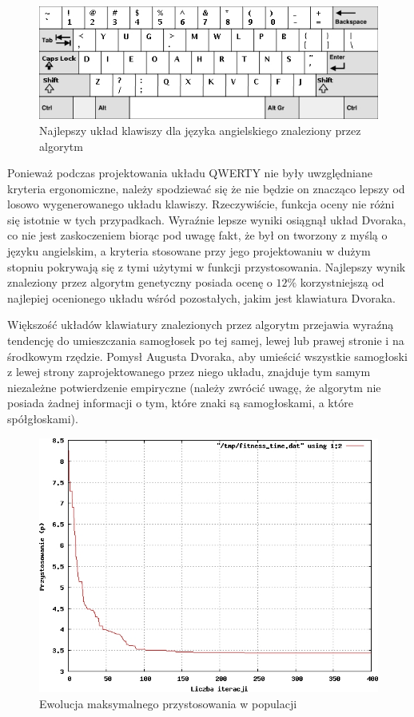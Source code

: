 \documentclass[brudnopis]{xmgr}
\begin{document}
\begin{figure}[!tbh]
\centering
\includegraphics[width=.8\hsize]{fig/best_en}
\caption{Najlepszy układ klawiszy dla języka angielskiego znaleziony przez algorytm}
\end{figure}

Ponieważ podczas projektowania układu QWERTY nie były uwzględniane kryteria ergonomiczne, należy spodziewać się że nie będzie on znacząco lepszy od losowo wygenerowanego układu klawiszy. Rzeczywiście, funkcja oceny nie różni się istotnie w tych przypadkach. Wyraźnie lepsze wyniki osiągnął układ Dvoraka, co nie jest zaskoczeniem biorąc pod uwagę fakt, że był on tworzony z myślą o języku angielskim, a kryteria stosowane przy jego projektowaniu w dużym stopniu pokrywają się z tymi użytymi w funkcji przystosowania. Najlepszy wynik znaleziony przez algorytm genetyczny posiada ocenę o $12\%$ korzystniejszą od najlepiej ocenionego układu wśród pozostałych, jakim jest klawiatura Dvoraka.

Większość układów klawiatury znalezionych przez algorytm przejawia wyraźną tendencję do umieszczania samogłosek po tej samej, lewej lub prawej stronie i na środkowym rzędzie. Pomysł Augusta Dvoraka, aby umieścić wszystkie samogłoski z lewej strony zaprojektowanego przez niego układu, znajduje tym samym niezależne potwierdzenie empiryczne (należy zwrócić uwagę, że algorytm nie posiada żadnej informacji o tym, które znaki są samogłoskami, a które spółgłoskami).

\begin{figure}[!tbh]
\centering
\includegraphics[width=.8\hsize]{fig/fitness_time_en}
\caption{Ewolucja maksymalnego przystosowania w populacji}
\end{figure}
\end{document}
